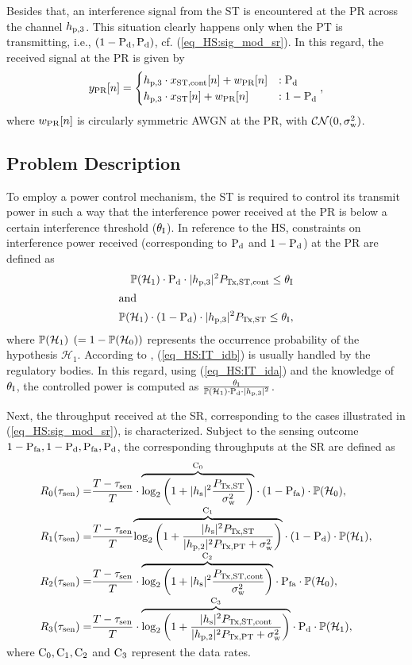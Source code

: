 Besides that, an interference signal from the ST is encountered at the PR across the channel $h_{\text{p,3}}$. This situation clearly happens only when the PT is transmitting, i.e., $(1 - \text{P}_{\text{d}}, \text{P}_{\text{d}})$, cf. (\ref{eq_HS:sig_mod_sr}). In this regard, the received signal at the PR is given by
\begin{equation}
y_{\text{PR}}[n] = 
\begin{cases}
h_{\text{p,3}} \cdot x_{\text{ST,cont}}[n] + w_{\text{PR}}[n] & : \text{P}_{\text{d}} \\
h_{\text{p,3}} \cdot x_{\text{ST}}[n] + w_{\text{PR}}[n] & : 1- \text{P}_{\text{d}} 
\end{cases},
\label{eq_HS:sig_mod_pr}
\end{equation}
where $w_{\text{PR}}[n]$ is circularly symmetric AWGN at the PR, with $\mathcal{CN}(0,\sigma^2_{\text{w}})$.

\subsection{Problem Description}
To employ a power control mechanism, the ST is required to control its transmit power in such a way that the interference power received at the PR is below a certain interference threshold ($\theta_{\text{I}}$). In reference to the HS, constraints on interference power received (corresponding to $\text{P}_{\text{d}}$ and $1 - \text{P}_{\text{d}}$) at the PR are defined as
\begin{align}
\mathbb P(\mathcal{H}_1) \cdot \text{P}_{\text{d}} \cdot |h_{\text{p,3}}|^2 P_{\text{Tx,ST,cont}} \le \theta_{\text{I}} \label{eq_HS:IT_ida} \\
\intertext{and   } 
\mathbb P(\mathcal{H}_1) \cdot (1 - \text{P}_{\text{d}}) \cdot |h_{\text{p,3}}|^2 P_{\text{Tx,ST}} \le \theta_{\text{I}} \label{eq_HS:IT_idb},
\end{align}
where $\mathbb P(\mathcal{H}_1)$ $(= 1 - \mathbb P(\mathcal{H}_0))$ represents the occurrence probability of the hypothesis $\mathcal H_1$. 
According to \cite{Sharma14}, (\ref{eq_HS:IT_idb}) is usually handled by the regulatory bodies. In this regard, using (\ref{eq_HS:IT_ida}) and the knowledge of $\theta_{\text{I}}$, the controlled power is computed as $\frac{\theta_{\text{I}}}{\mathbb P(\mathcal{H}_1) \cdot \text{P}_{\text{d}} \cdot |h_{\text{p,3}}|^2}$.

Next, the throughput received at the SR, corresponding to the cases illustrated in (\ref{eq_HS:sig_mod_sr}), is characterized. Subject to the sensing outcome $1 - \text{P}_{\text{fa}}, 1 - \text{P}_{\text{d}}, \text{P}_{\text{fa}}, \text{P}_{\text{d}}$, the corresponding throughputs at the SR are defined as 
\begin{align}
R_{\text{0}}(\tau_{\text{sen}}) =& \frac{T- \tau_{\text{sen}}}{T} \cdot \smash[b]{\overbrace{\log_2 \left(1 + |h_{\text{s}}|^2 \frac{P_{\text{Tx,ST}}}{\sigma^2_{\text{w}}}\right)}^{\text{C}_{\text{0}}}} \cdot (1 - \text{P}_{\text{fa}} ) \cdot \mathbb P(\mathcal{H}_0),  \label{eq_HS:Cap0} \\ 
R_{\text{1}}(\tau_{\text{sen}}) =& \frac{T- \tau_{\text{sen}}}{T} \smash[b]{\overbrace{\log_2 \left(1 + \frac{|h_{\text{s}}|^2 P_{\text{Tx,ST}} }{|h_{\text{p,2}}|^2 P_{\text{Tx,PT}}  + \sigma^2_{\text{w}}} \right)}^{\text{C}_{\text{1}}}} \cdot (1 - \text{P}_{\text{d}}) \cdot \mathbb P(\mathcal{H}_1),  \label{eq_HS:Cap1} \\ 
R_{\text{2}}(\tau_{\text{sen}}) =& \frac{T- \tau_{\text{sen}}}{T} \cdot \smash[b]{\overbrace{\log_2 \left(1 + |h_{\text{s}}|^2 \frac{P_{\text{Tx,ST,cont}}}{\sigma^2_{\text{w}}}\right)}^{\text{C}_{\text{2}}}}  \cdot \text{P}_{\text{fa}} \cdot \mathbb P(\mathcal{H}_0),  \label{eq_HS:Cap2} \\ 
R_{\text{3}}(\tau_{\text{sen}}) =& \frac{T- \tau_{\text{sen}}}{T} \cdot \smash[b]{\overbrace{\log_2 \left(1 + \frac{|h_{\text{s}}|^2 P_{\text{Tx,ST,cont}} }{|h_{\text{p,2}}|^2 P_{\text{Tx,PT}}  + \sigma^2_{\text{w}}} \right)}^{\text{C}_{\text{3}}}} \cdot \text{P}_{\text{d}} \cdot \mathbb P(\mathcal{H}_1),  \label{eq_HS:Cap3}  
\end{align}
where $\text{C}_{\text{0}}, \text{C}_{\text{1}}, \text{C}_{\text{2}}$ and $\text{C}_{\text{3}}$ represent the data rates.

